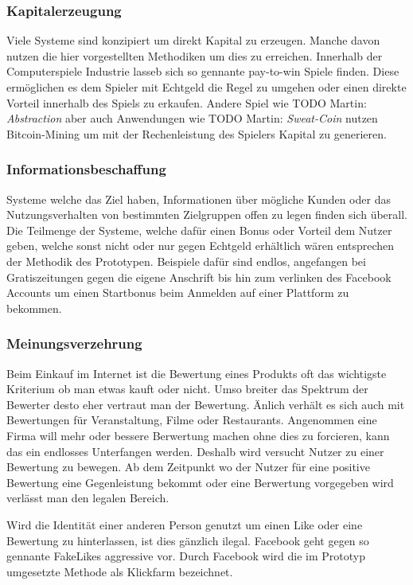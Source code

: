 \documentclass[german]{cgspaper} %
\newcommand{\todo}[1]{\textit{#1}}
\newcommand{\Martin}[1]{\textcolor{colorMartin}{TODO Martin:} \todo{#1} }
\begin{document}
\subsubsection{Kapitalerzeugung}

Viele Systeme sind konzipiert um direkt Kapital zu erzeugen.
Manche davon nutzen die hier vorgestellten Methodiken um dies zu erreichen. 
Innerhalb der Computerspiele Industrie lasseb sich so gennante pay-to-win Spiele finden.
Diese ermöglichen es dem Spieler mit Echtgeld die Regel zu umgehen oder einen direkte Vorteil innerhalb des Spiels zu erkaufen.
Andere Spiel wie \Martin{Abstraction} aber auch Anwendungen wie \Martin{Sweat-Coin} nutzen Bitcoin-Mining um mit der Rechenleistung des Spielers Kapital zu generieren.

\subsubsection{Informationsbeschaffung}

Systeme welche das Ziel haben, Informationen über mögliche Kunden oder das Nutzungsverhalten von bestimmten Zielgruppen offen zu legen finden sich überall.
Die Teilmenge der Systeme, welche dafür einen Bonus oder Vorteil dem Nutzer geben, welche sonst nicht oder nur gegen Echtgeld erhältlich wären entsprechen der Methodik des Prototypen.
Beispiele dafür sind endlos, angefangen bei Gratiszeitungen gegen die eigene Anschrift bis hin zum verlinken des Facebook Accounts um einen Startbonus beim Anmelden auf einer Plattform zu bekommen.

\subsubsection{Meinungsverzehrung}

Beim Einkauf im Internet ist die Bewertung eines Produkts oft das wichtigste Kriterium ob man etwas kauft oder nicht.
Umso breiter das Spektrum der Bewerter desto eher vertraut man der Bewertung.
Änlich verhält es sich auch mit Bewertungen für Veranstaltung, Filme oder Restaurants.
Angenommen eine Firma will mehr oder bessere Berwertung machen ohne dies zu forcieren, kann das ein endlosses Unterfangen werden.
Deshalb wird versucht Nutzer zu einer Bewertung zu bewegen.
Ab dem Zeitpunkt wo der Nutzer für eine positive Bewertung eine Gegenleistung bekommt oder eine Berwertung vorgegeben wird verlässt man den legalen Bereich.

Wird die Identität einer anderen Person genutzt um einen Like oder eine Bewertung zu hinterlassen, ist dies gänzlich ilegal.
Facebook geht gegen so gennante FakeLikes aggressive vor.
Durch Facebook wird die im Prototyp umgesetzte Methode als Klickfarm bezeichnet. \cite{FakeLikes2018}
\end{document}
